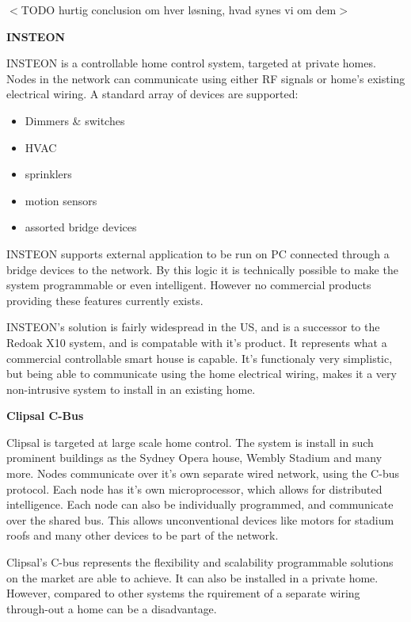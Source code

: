 $<$TODO hurtig conclusion om hver løsning, hvad synes vi om dem$>$

\textbf{INSTEON}

INSTEON is a controllable home control system, targeted at private homes. Nodes in the network can communicate using either RF signals or home's existing electrical wiring. A standard array of devices are supported: 

\begin{itemize}
\item Dimmers \& switches

\item HVAC

\item sprinklers

\item motion sensors

\item assorted bridge devices

\end{itemize}

INSTEON supports external application to be run on PC connected through a bridge devices to the network. By this logic it is technically possible to make the system programmable or even intelligent. However no commercial products providing these features currently exists. ~\citep{INSTEON}

INSTEON's solution is fairly widespread in the US, and is a successor to the Redoak X10 system, and is compatable with it's product. It represents what a commercial controllable smart house is capable. It's functionaly very simplistic, but being able to communicate using the home electrical wiring, makes it a very non-intrusive system to install in an existing home. 



\textbf{Clipsal C-Bus}

Clipsal is targeted at large scale home control. The system is install in such prominent buildings as the Sydney Opera house, Wembly Stadium and many more. Nodes communicate over it's own separate wired network, using the C-bus protocol. Each node has it's own microprocessor, which allows for distributed intelligence. Each node can also be individually programmed, and communicate over the shared bus. This allows unconventional devices like motors for stadium roofs and many other devices to be part of the network. 

Clipsal's C-bus represents the flexibility and scalability programmable solutions on the market are able to achieve. It can also be installed in a private home. However, compared to other systems the rquirement of a separate wiring through-out a home can be a disadvantage. ~\citep{CBus}



